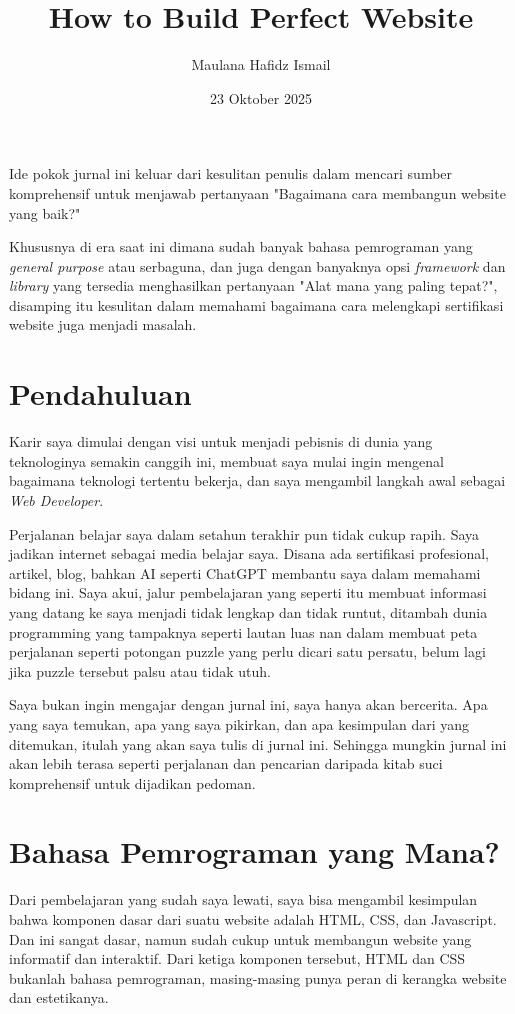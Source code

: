 \documentclass{article}
\title{How to Build Perfect Website}
\date{ 23 Oktober 2025}
\author{Maulana Hafidz Ismail}
\begin{document}
\maketitle
\newpage

Ide pokok jurnal ini keluar dari kesulitan penulis dalam mencari sumber komprehensif untuk menjawab pertanyaan "Bagaimana cara membangun website yang baik?"

Khususnya di era saat ini dimana sudah banyak bahasa pemrograman yang \textit{general purpose} atau serbaguna, dan juga dengan banyaknya opsi \textit{framework} dan \textit{library} yang tersedia menghasilkan pertanyaan "Alat mana yang paling tepat?", disamping itu kesulitan dalam memahami bagaimana cara melengkapi sertifikasi website juga menjadi masalah.
\newpage

\tableofcontents
\newpage
{}

\section{Pendahuluan}
Karir saya dimulai dengan visi untuk menjadi pebisnis di dunia yang teknologinya semakin canggih ini, membuat saya mulai ingin mengenal bagaimana teknologi tertentu bekerja, dan saya mengambil langkah awal sebagai \textit{Web Developer}.

Perjalanan belajar saya dalam setahun terakhir pun tidak cukup rapih. Saya jadikan internet sebagai media belajar saya. Disana ada sertifikasi profesional, artikel, blog, bahkan AI seperti ChatGPT membantu saya dalam memahami bidang ini. Saya akui, jalur pembelajaran yang seperti itu membuat informasi yang datang ke saya menjadi tidak lengkap dan tidak runtut, ditambah dunia programming yang tampaknya seperti lautan luas nan dalam membuat peta perjalanan seperti potongan puzzle yang perlu dicari satu persatu, belum lagi jika puzzle tersebut palsu atau tidak utuh.

Saya bukan ingin mengajar dengan jurnal ini, saya hanya akan bercerita. Apa yang saya temukan, apa yang saya pikirkan, dan apa kesimpulan dari yang ditemukan, itulah yang akan saya tulis di jurnal ini. Sehingga mungkin jurnal ini akan lebih terasa seperti perjalanan dan pencarian daripada kitab suci komprehensif untuk dijadikan pedoman.

\section{Bahasa Pemrograman yang Mana?}
Dari pembelajaran yang sudah saya lewati, saya bisa mengambil kesimpulan bahwa komponen dasar dari suatu website adalah HTML, CSS, dan Javascript. Dan ini sangat dasar, namun sudah cukup untuk membangun website yang informatif dan interaktif. Dari ketiga komponen tersebut, HTML dan CSS bukanlah bahasa pemrograman, masing-masing punya peran di kerangka website dan estetikanya.
\end{document}
